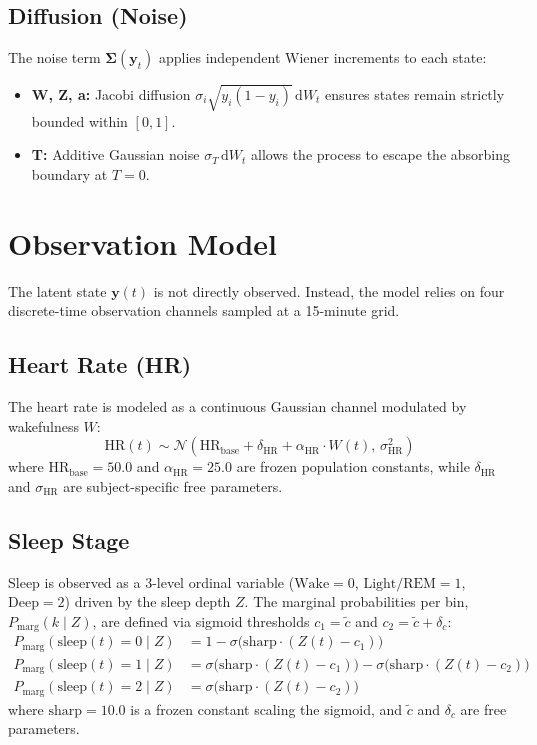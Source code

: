 \documentclass[11pt,a4paper]{article}
\begin{document}
\subsection{Diffusion (Noise)}
The noise term $\boldsymbol{\Sigma}(\mathbf{y}_t)$ applies independent Wiener increments to each state:
\begin{itemize}
    \item \textbf{W, Z, a:} Jacobi diffusion $\sigma_i \sqrt{y_i(1-y_i)} \, \mathrm{d}W_t$ ensures states remain strictly bounded within $[0, 1]$.
    \item \textbf{T:} Additive Gaussian noise $\sigma_T \, \mathrm{d}W_t$ allows the process to escape the absorbing boundary at $T=0$.
\end{itemize}

\section{Observation Model}

The latent state $\mathbf{y}(t)$ is not directly observed. Instead, the model relies on four discrete-time observation channels sampled at a 15-minute grid.

\subsection{Heart Rate (HR)}
The heart rate is modeled as a continuous Gaussian channel modulated by wakefulness $W$:
\[
\text{HR}(t) \sim \mathcal{N}\left(\text{HR}_{\text{base}} + \delta_{\text{HR}} + \alpha_{\text{HR}} \cdot W(t), \, \sigma_{\text{HR}}^2\right)
\]
where $\text{HR}_{\text{base}} = 50.0$ and $\alpha_{\text{HR}} = 25.0$ are frozen population constants, while $\delta_{\text{HR}}$ and $\sigma_{\text{HR}}$ are subject-specific free parameters.

\subsection{Sleep Stage}
Sleep is observed as a 3-level ordinal variable ($\text{Wake} = 0$, $\text{Light/REM} = 1$, $\text{Deep} = 2$) driven by the sleep depth $Z$. The marginal probabilities per bin, $P_{\text{marg}}(k \mid Z)$, are defined via sigmoid thresholds $c_1 = \tilde{c}$ and $c_2 = \tilde{c} + \delta_c$:
\begin{align*}
P_{\text{marg}}(\text{sleep}(t) = 0 \mid Z) &= 1 - \sigma\big(\text{sharp} \cdot (Z(t) - c_1)\big) \\
P_{\text{marg}}(\text{sleep}(t) = 1 \mid Z) &= \sigma\big(\text{sharp} \cdot (Z(t) - c_1)\big) - \sigma\big(\text{sharp} \cdot (Z(t) - c_2)\big) \\
P_{\text{marg}}(\text{sleep}(t) = 2 \mid Z) &= \sigma\big(\text{sharp} \cdot (Z(t) - c_2)\big)
\end{align*}
where $\text{sharp} = 10.0$ is a frozen constant scaling the sigmoid, and $\tilde{c}$ and $\delta_c$ are free parameters. 
\end{document}
